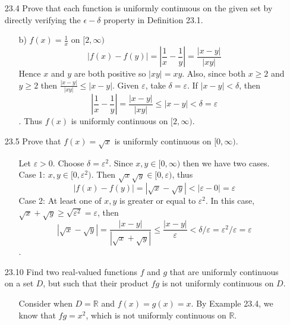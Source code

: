 \documentclass[12pt]{article}
\begin{document}
\begin{enumerate}
\begin{enumerate}
\item[23.4] Prove that each function is uniformly continuous on the given set by directly verifying the $\epsilon-\delta$ property in Definition 23.1.
\begin{enumerate}
\item[b)] $f(x) = \frac{1}{x}$ on $[2, \infty )$
\[
|f(x) - f(y)| = |\frac{1}{x} - \frac{1}{y}| = \frac{|x - y|}{|xy|}
\]
Hence $x$ and $y$ are both positive so $|xy| = xy$. Also, since both 
$x \geq 2$ and $y \geq 2$ then $\frac{|x - y|}{|xy|} \leq |x - y|$.
Given $\varepsilon$, take $\delta = \varepsilon$.
If $|x - y| < \delta$, then \[
|\frac{1}{x} - \frac{1}{y}| = \frac{|x - y|}{|xy|} \leq |x - y| < \delta =
\varepsilon
\]. Thus $f(x)$ is uniformly continuous on $[2, \infty)$.
\end{enumerate}

\item[23.5] Prove that $f(x) = \sqrt{x}$ is uniformly continuous on $[0, \infty )$.
\begin{enumerate}
\item[] Let $\varepsilon > 0$. Choose $\delta = \varepsilon^2$. Since
$x, y \in [0, \infty)$ then we have two cases. \\
Case 1: $x, y \in [0, \varepsilon^2)$. Then $\sqrt{x}\sqrt{y} \in [0, \varepsilon)$,
thus \[ |f(x) - f(y)| = |\sqrt{x} - \sqrt{y}| < |\varepsilon - 0| = \varepsilon \]
Case 2: At least one of $x, y$ is greater or equal to $\varepsilon^2$. In this
case, $\sqrt{x} + \sqrt{y} \geq \sqrt{\varepsilon^2} = \varepsilon$, then
\[
|\sqrt{x} - \sqrt{y}| = \frac{|x - y|}{|\sqrt{x} + \sqrt{y}|} \leq 
\frac{|x - y|}{\varepsilon} < \delta/\varepsilon = \varepsilon^2/\varepsilon 
= \varepsilon 
\].
\end{enumerate}

\item[23.10] Find two real-valued functions $f$ and $g$ that are uniformly continuous on a set $D$, but such that their product $fg$ is not uniformly continuous on $D$.
\begin{enumerate}
\item[] Consider when $D = \mathbb{R}$ and $f(x) = g(x) = x$. By Example 23.4, we
know that $fg = x^2$, which is not uniformly continuous on $\mathbb{R}$.
\end{enumerate}


\end{enumerate}
\end{enumerate}
\end{document}

